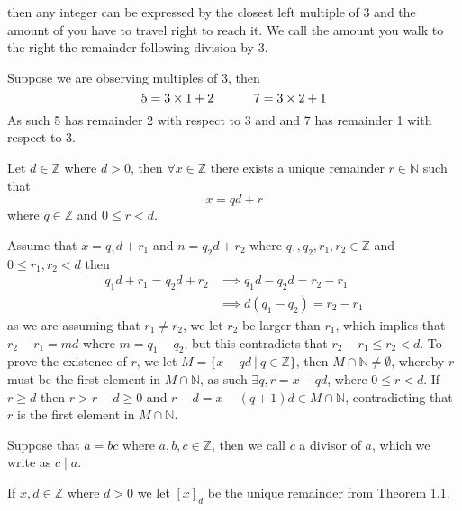 then any integer can be expressed by the closest left multiple of 3 and the amount of you have to travel right to reach it.
We call the amount you walk to the right the remainder following division by 3.
\begin{exmp}
    Suppose we are observing multiples of 3, then
    \[
        5=3\times 1+2\hskip 32pt 7=3\times 2+1
    \]
    As such 5 has remainder 2 with respect to 3 and and 7 has remainder 1 with respect to 3.
\end{exmp}
\begin{theo}
    Let $d\in\mathbb{Z}$ where $d>0$, then $\forall x\in\mathbb{Z}$ there exists a unique remainder $r\in\mathbb{N}$ such that
    \[
        x=qd+r
    \]
    where $q\in\mathbb{Z}$ and $0\leq r<d$.
\end{theo}
\begin{prf}
    Assume that $x=q_{1}d+r_{1}$ and $n=q_{2}d+r_{2}$ where $q_{1},q_{2},r_{1},r_{2}\in\mathbb{Z}$ and $0\leq r_{1},r_{2}<d$ then
    \begin{align*}
        q_{1}d+r_{1}=q_{2}d+r_{2}&\implies q_{1}d-q_{2}d=r_{2}-r_{1} \\
                     &\implies d(q_{1}-q_{2})=r_{2}-r_{1}
    \end{align*}
    as we are assuming that $r_{1}\neq r_{2}$, we let $r_{2}$ be larger than $r_{1}$, which implies that $r_{2}-r_{1}=md$ where $m=q_{1}-q_{2}$, but this contradicts that $r_{2}-r_{1}\leq r_{2}<d$. To prove the existence of $r$, we let $M=\{x-qd~|~q\in\mathbb{Z}\}$, then $M\cap\mathbb{N}\neq\emptyset$, whereby $r$ must be the first element in $M\cap\mathbb{N}$, as such $\exists q,r=x-qd$, where $0\leq r<d$. If $r\geq d$ then $r>r-d\geq 0$ and $r-d=x-(q+1)d\in M\cap\mathbb{N}$, contradicting that $r$ is the first element in $M\cap\mathbb{N}$.
\end{prf}
\begin{defi}[Divisor]
    Suppose that $a=bc$ where $a,b,c\in\mathbb{Z}$, then we call $c$
    a divisor of $a$, which we write as $c\mid a$.
\end{defi}
\begin{defi}[Remainder]
    If $x,d\in\mathbb{Z}$ where $d>0$ we let $[x]_{d}$ be the unique remainder from Theorem 1.1.
\end{defi}
